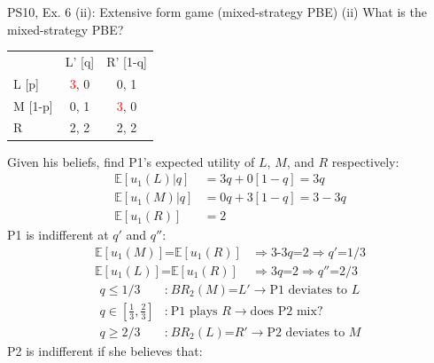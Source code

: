 \begin{frame}{PS10, Ex. 6 (ii): Extensive form game (mixed-strategy PBE)}
    (ii) What is the mixed-strategy PBE? \vspace{-8pt}
    \begin{multicols}{2}
      \begin{table}
        \begin{tabular}{l|c|c|}
          \multicolumn{1}{c}{} & \multicolumn{1}{c}{L' [q]} & \multicolumn{1}{c}{R' [1-q]} \\\cline{2-3}
          L [p]   & \textcolor{red}{3}, 0 & 0, \color{blue}1 \\\cline{2-3}
          M [1-p] & 0, \color{blue}1 & \textcolor{red}{3}, 0 \\\cline{2-3}
          R       & 2, \color{blue}2 & 2, \color{blue}2 \\\cline{2-3}
        \end{tabular}
      \end{table} \vspace{-4pt}
      Given his beliefs, find P1's expected utility of $L$, $M$, and $R$ respectively: \vspace{-4pt}
      \begin{align*}
        \mathbb{E}[u_1(L)|q]&=3q+0[1-q]=3q\\
        \mathbb{E}[u_1(M)|q]&=0q+3[1-q]=3-3q\\
        \mathbb{E}[u_1(R)]&=2
      \end{align*}
      P1 is indifferent at $q'$ and $q''$: \vspace{-6pt}
      \begin{align*}
        \mathbb{E}[u_1(M)]\text{=}\mathbb{E}[u_1(R)]&\Rightarrow \text{3-3}q\text{=}2\Rightarrow q'\text{=}1/3\\
        \mathbb{E}[u_1(L)]\text{=}\mathbb{E}[u_1(R)]&\Rightarrow 3q\text{=}2\Rightarrow q''\text{=}2/3
      \end{align*} \vspace{-16pt}
      \begin{align*}
        q\leq1/3&\text{:}\ BR_2(M)\text{=}L'\rightarrow\text{P1 deviates to }L\\
        q\text{$\in$}{\textstyle\left[\frac{1}{3},\frac{2}{3}\right]}&\text{:}\ \text{P1 plays }R\rightarrow\text{does P2 mix?}\\
        q\geq2/3&\text{:}\ BR_2(L)\text{=}R'\rightarrow\text{P2 deviates to }M
      \end{align*}
      P2 is indifferent if she believes that: \vspace{-6pt}

\end{multicols}
\end{frame}
